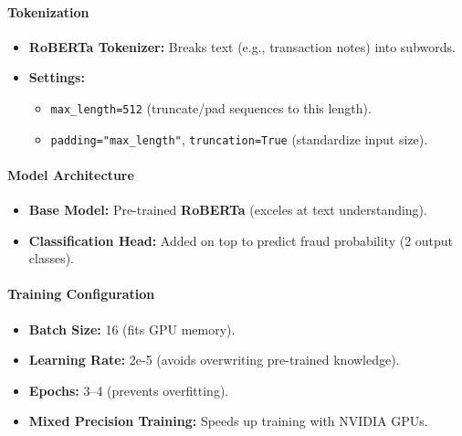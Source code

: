 \documentclass[
]{article}
\providecommand{\tightlist}{%
  \setlength{\itemsep}{0pt}\setlength{\parskip}{0pt}}
\begin{document}
\paragraph{\texorpdfstring{\textbf{Tokenization}}{Tokenization}}\label{tokenization}

\begin{itemize}
\tightlist
\item
  \textbf{RoBERTa Tokenizer:} Breaks text (e.g., transaction notes) into
  subwords.\\
\item
  \textbf{Settings:}

  \begin{itemize}
  \tightlist
  \item
    \texttt{max\_length=512} (truncate/pad sequences to this length).\\
  \item
    \texttt{padding="max\_length"}, \texttt{truncation=True}
    (standardize input size).
  \end{itemize}
\end{itemize}

\paragraph{\texorpdfstring{\textbf{Model
Architecture}}{Model Architecture}}\label{model-architecture}

\begin{itemize}
\tightlist
\item
  \textbf{Base Model:} Pre-trained \textbf{RoBERTa} (exceles at text
  understanding).\\
\item
  \textbf{Classification Head:} Added on top to predict fraud
  probability (2 output classes).
\end{itemize}

\paragraph{\texorpdfstring{\textbf{Training
Configuration}}{Training Configuration}}\label{training-configuration}

\begin{itemize}
\tightlist
\item
  \textbf{Batch Size:} 16 (fits GPU memory).\\
\item
  \textbf{Learning Rate:} 2e-5 (avoids overwriting pre-trained
  knowledge).\\
\item
  \textbf{Epochs:} 3--4 (prevents overfitting).\\
\item
  \textbf{Mixed Precision Training:} Speeds up training with NVIDIA
  GPUs.
\end{itemize}
\end{document}

